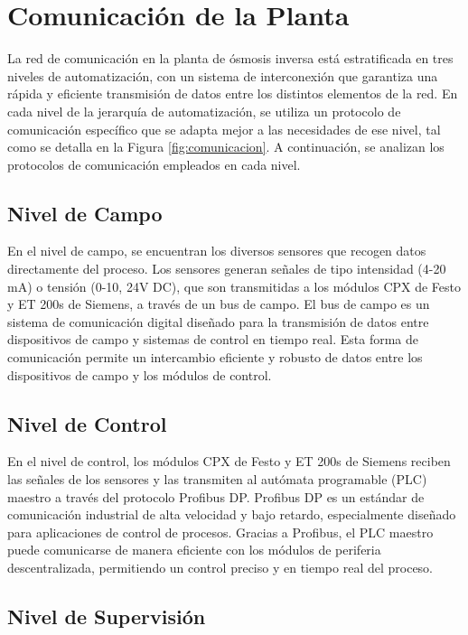 \section{Comunicación de la Planta}

La red de comunicación en la planta de ósmosis inversa está estratificada en tres niveles de automatización, con un sistema de interconexión que garantiza una rápida y eficiente transmisión de datos entre los distintos elementos de la red. En cada nivel de la jerarquía de automatización, se utiliza un protocolo de comunicación específico que se adapta mejor a las necesidades de ese nivel, tal como se detalla en la Figura \ref{fig:comunicacion}. A continuación, se analizan los protocolos de comunicación empleados en cada nivel.

\subsection*{Nivel de Campo}

En el nivel de campo, se encuentran los diversos sensores que recogen datos directamente del proceso. Los sensores generan señales de tipo intensidad (4-20 mA) o tensión (0-10, 24V DC), que son transmitidas a los módulos CPX de Festo y ET 200s de Siemens, a través de un bus de campo. El bus de campo es un sistema de comunicación digital diseñado para la transmisión de datos entre dispositivos de campo y sistemas de control en tiempo real. Esta forma de comunicación permite un intercambio eficiente y robusto de datos entre los dispositivos de campo y los módulos de control.

\subsection*{Nivel de Control}

En el nivel de control, los módulos CPX de Festo y ET 200s de Siemens reciben las señales de los sensores y las transmiten al autómata programable (PLC) maestro a través del protocolo Profibus DP. Profibus DP es un estándar de comunicación industrial de alta velocidad y bajo retardo, especialmente diseñado para aplicaciones de control de procesos. Gracias a Profibus, el PLC maestro puede comunicarse de manera eficiente con los módulos de periferia descentralizada, permitiendo un control preciso y en tiempo real del proceso.

\subsection*{Nivel de Supervisión}

